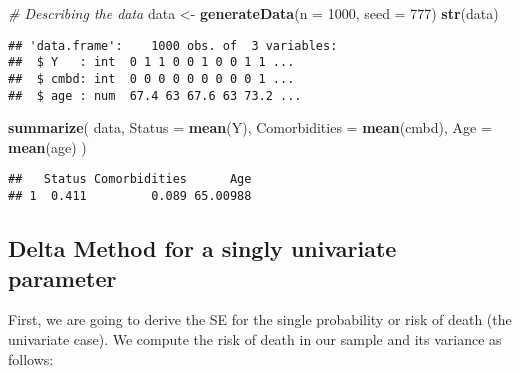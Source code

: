 \documentclass[
]{article}
\newenvironment{Shaded}{\begin{snugshade}}{\end{snugshade}}
\newcommand{\CommentTok}[1]{\textcolor[rgb]{0.56,0.35,0.01}{\textit{#1}}}
\newcommand{\DataTypeTok}[1]{\textcolor[rgb]{0.13,0.29,0.53}{#1}}
\newcommand{\DecValTok}[1]{\textcolor[rgb]{0.00,0.00,0.81}{#1}}
\newcommand{\KeywordTok}[1]{\textcolor[rgb]{0.13,0.29,0.53}{\textbf{#1}}}
\newcommand{\NormalTok}[1]{#1}
\newcommand{\OperatorTok}[1]{\textcolor[rgb]{0.81,0.36,0.00}{\textbf{#1}}}
\newcommand{\StringTok}[1]{\textcolor[rgb]{0.31,0.60,0.02}{#1}}
\begin{document}
\begin{Shaded}
\begin{Highlighting}[]
\CommentTok{# Describing the data}
\NormalTok{data <-}\StringTok{ }\KeywordTok{generateData}\NormalTok{(}\DataTypeTok{n =} \DecValTok{1000}\NormalTok{, }\DataTypeTok{seed =} \DecValTok{777}\NormalTok{) }
\KeywordTok{str}\NormalTok{(data)}
\end{Highlighting}
\end{Shaded}

\begin{verbatim}
## 'data.frame':    1000 obs. of  3 variables:
##  $ Y   : int  0 1 1 0 0 1 0 0 1 1 ...
##  $ cmbd: int  0 0 0 0 0 0 0 0 0 1 ...
##  $ age : num  67.4 63 67.6 63 73.2 ...
\end{verbatim}

\begin{Shaded}
\begin{Highlighting}[]
\KeywordTok{summarize}\NormalTok{(}
\NormalTok{  data,}
  \DataTypeTok{Status =} \KeywordTok{mean}\NormalTok{(Y), }
  \DataTypeTok{Comorbidities =} \KeywordTok{mean}\NormalTok{(cmbd),}
  \DataTypeTok{Age =}  \KeywordTok{mean}\NormalTok{(age)}
\NormalTok{  )}
\end{Highlighting}
\end{Shaded}

\begin{verbatim}
##   Status Comorbidities      Age
## 1  0.411         0.089 65.00988
\end{verbatim}

\hypertarget{delta-method-for-a-singly-univariate-parameter}{%
\subsection{Delta Method for a singly univariate
parameter}\label{delta-method-for-a-singly-univariate-parameter}}

First, we are going to derive the SE for the single probability or risk
of death (the univariate case). We compute the risk of death in our
sample and its variance as follows:

\begin{Shaded}
\end{Shaded}
\end{document}
